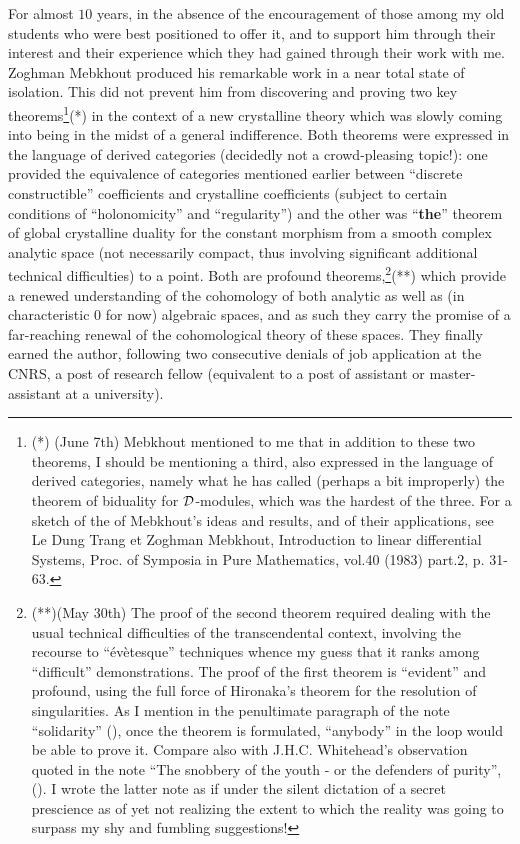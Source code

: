 For almost $10$ years, in the absence of the encouragement of those among my old students
who were best positioned to offer it, and to support him through their interest and their
experience which they had gained through their work with me. 
Zoghman Mebkhout produced his remarkable work in a near total state of isolation. 
This did not prevent him from discovering and proving two key theorems\footnote{(*) (June
7th) Mebkhout mentioned to me that in addition to these two theorems, I should be
mentioning a third, also expressed in the language of derived categories, namely what he
has called (perhaps a bit improperly) the theorem of biduality for $\mathcal{D}$-modules, which
was the hardest of the three. For a sketch of the of Mebkhout's ideas and results, and of
their applications, see
Le Dung Trang et Zoghman Mebkhout, Introduction to linear differential Systems, Proc. of
Symposia in Pure Mathematics, vol.40 (1983) part.2, p. 31-63.
}(*)
in the context of a
new crystalline theory which was slowly coming into being 
in the midst of a general indifference.
Both theorems
were expressed in the language of derived categories
(decidedly not a crowd-pleasing topic!): one provided the equivalence of categories
mentioned earlier between ``discrete constructible'' coefficients and crystalline coefficients
(subject to certain conditions of ``holonomicity'' and ``regularity'')
and the other was ``\textbf{the}'' theorem of global crystalline duality for the constant morphism
from a smooth complex analytic space (not necessarily compact, thus involving significant
additional technical difficulties) to a point.
Both are profound theorems,\footnote{(**)(May 30th) The proof of the second theorem
required dealing with the usual technical difficulties of the transcendental context,
involving the recourse to ``\'ev\`etesque'' techniques whence my guess that it ranks among
``difficult'' demonstrations. The proof of the first theorem is ``evident'' and profound,
using the full force of
Hironaka's theorem for the resolution of singularities. As I mention in the penultimate
paragraph of the note ``solidarity'' (), once the theorem is formulated, 
``anybody'' in the loop would be able to prove it. Compare also with J.H.C. Whitehead's
observation quoted in the
note ``The snobbery of the youth - or the defenders of purity'', ().
I wrote the latter note as if under the silent dictation of a secret prescience as of yet
not realizing the extent to which the reality was going to surpass my shy and fumbling
suggestions!}(**)
which provide a renewed 
understanding of the cohomology of both analytic as well as
(in characteristic $0$ for now) algebraic spaces, and as such they carry the promise of a
far-reaching renewal of the cohomological theory of these spaces.
They finally earned the author, following two consecutive denials of job application at
the CNRS, a post of research fellow
(equivalent to a post of assistant or master-assistant at a university).

